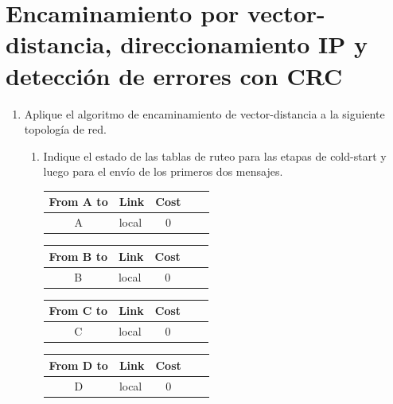 \section*{Encaminamiento por vector-distancia, direccionamiento IP y detecci\'on de errores con CRC}

\begin{enumerate}
    \item Aplique el algoritmo de encaminamiento de vector-distancia a la siguiente topolog\'ia de red.
    \begin{enumerate}
        \item Indique el estado de las tablas de ruteo para las etapas de cold-start y luego para el env\'io de los primeros dos mensajes.
        \begin{table}[H]
            \begin{tabular}{@{}clcll@{}}
            \toprule
            From A to            & \multicolumn{1}{c}{Link} & Cost                 \\ \midrule
            A                    & local                    & 0                    \\ \bottomrule
            \end{tabular}
            \hfill
            \begin{tabular}{@{}clcll@{}}
                \toprule
                From B to            & \multicolumn{1}{c}{Link} & Cost                 \\ \midrule
                B                    & local                    & 0                    \\ \bottomrule
            \end{tabular}
            \hfill
            \begin{tabular}{@{}clcll@{}}
                \toprule
                From C to            & \multicolumn{1}{c}{Link} & Cost                 \\ \midrule
                C                    & local                    & 0                    \\ \bottomrule
            \end{tabular}
            \vfill
            \begin{tabular}{@{}clcll@{}}
                \toprule
                From D to            & \multicolumn{1}{c}{Link} & Cost                 \\ \midrule
                D                    & local                    & 0                    \\ \bottomrule

\end{tabular}
\end{table}
\end{enumerate}
\end{enumerate}
